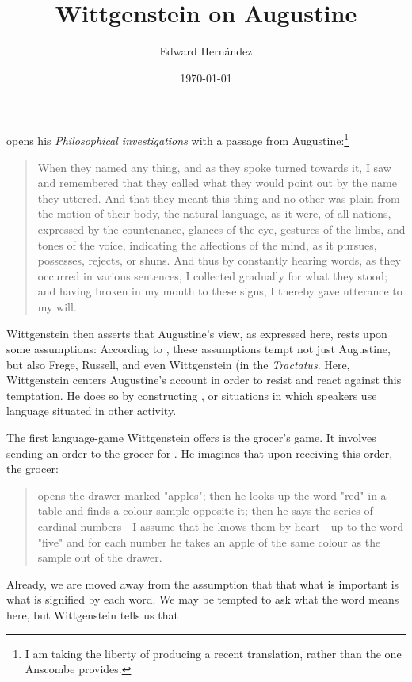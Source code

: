 \documentclass[doc,12pt,apacite,biblatex]{apa6}
\begin{document}
 \title{Wittgenstein on Augustine}
\author{Edward Hern\'{a}ndez}
\date{\today}

\maketitle

 opens his \emph{Philosophical investigations} with a
passage from Augustine:\footnote{I am taking the liberty of producing a recent
translation, rather than the one Anscombe provides.} \begin{quote} When they
	named any thing, and as they spoke turned towards it, I saw and
	remembered that they called what they would point out by the name they
	uttered. And that they meant this thing and no other was plain from the
	motion of their body, the natural language, as it were, of all nations,
	expressed by the countenance, glances of the eye, gestures of the
	limbs, and tones of the voice, indicating the affections of the mind,
	as it pursues, possesses, rejects, or shuns. And thus by constantly
	hearing words, as they occurred in various sentences, I collected
	gradually for what they stood; and having broken in my mouth to these
	signs, I thereby gave utterance to my will.  \cite[\S~1.8.13]{Pusey09}
\end{quote} Wittgenstein then asserts that Augustine's view, as expressed here,
rests upon some assumptions: 
According to \cite{McGinn97}, these assumptions tempt not just Augustine, but
also Frege, Russell, and even Wittgenstein (in the \emph{Tractatus}. Here,
Wittgenstein centers Augustine's account in order to resist and react against
this temptation. He does so by constructing , or situations
in which speakers use language situated in other activity.

The first language-game Wittgenstein offers is the grocer's game. It involves
sending an order to the grocer for . He imagines that upon
receiving this order, the grocer: \begin{quote} opens the drawer marked
	"apples"; then he looks up the word "red" in a table and finds a colour
	sample opposite it; then he says the series of cardinal numbers---I
	assume that he knows them by heart---up to the word "five" and for each
	number he takes an apple of the same colour as the sample out of the
drawer. \cite[\S~1]{Wittgenstein53} \end{quote} Already, we are moved away from
the assumption that that what is important is what is signified by each word.
We may be tempted to ask what the word  means here, but Wittgenstein
tells us that 
\end{document}
